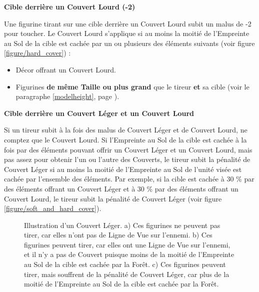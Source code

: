 \noindent\textbf{Cible derrière un Couvert Lourd (-2)}

Une figurine tirant sur une cible derrière un Couvert Lourd subit un malus de -2 pour toucher. Le Couvert Lourd s'applique si au moins la moitié de l'Empreinte au Sol de la cible est cachée par un ou plusieurs des éléments suivants (voir figure \ref{figure/hard_cover}) :
\begin{itemize}[label={-}]
\item Décor offrant un Couvert Lourd.
\item Figurines \textbf{de même Taille ou plus grand} que le tireur \textbf{et} sa cible (voir le paragraphe \ref{modelheight}, page \pageref{modelheight}).
\end{itemize}

\noindent\textbf{Cible derrière un Couvert Léger et un Couvert Lourd}

Si un tireur subit à la fois des malus de Couvert Léger et de Couvert Lourd, ne comptez que le Couvert Lourd. Si l'Empreinte au Sol de la cible est cachée à la fois par des éléments pouvant offrir un Couvert Léger et un Couvert Lourd, mais pas assez pour obtenir l'un ou l'autre des Couverts, le tireur subit la pénalité de Couvert Léger si au moins la moitié de l'Empreinte au Sol de l'unité visée est cachée par l'ensemble des éléments. Par exemple, si la cible est cachée à 30 \% par des éléments offrant un Couvert Léger et à 30 \% par des éléments offrant un Couvert Lourd, le tireur subit la pénalité de Couvert Léger (voir figure \ref{figure/soft_and_hard_cover}).

\newcommand{\figureSCNotinlightofsight}{\normalfontsize{\textit{Pas de Ligne de Vue}}}
\newcommand{\figureSCForest}{Forêt}
\newcommand{\figureSCFire}{\smallfontsize{\textit{Feu !}}}
\newcommand{\figureSCA}{a)}
\newcommand{\figureSCB}{b)}
\newcommand{\figureSCC}{c)}
\newcommand{\figureSCWithinlightofsight}{\normalfontsize{\textit{Ligne de Vue !}}}
\newcommand{\figureSCLessthanhalfoffootprintobscured}{\normalfontsize{\textit{Moins de 50 \% cachée}}}
\newcommand{\figureSCMorethanhalfoffootprintobscured}{\normalfontsize{\textit{Plus de 50 \% cachée}}}

\vspace*{1.5cm}

\begin{figure}[!htbp]
\centering
\def\svgwidth{\textwidth}

\caption{Illustration d'un Couvert Léger.\vspace*{10pt}\newline
a) Ces figurines ne peuvent pas tirer, car elles n'ont pas de Ligne de Vue sur l'ennemi.\vspace*{10pt}\newline
b) Ces figurines peuvent tirer, car elles ont une Ligne de Vue sur l'ennemi, et il n'y a pas de Couvert puisque moins de la moitié de l'Empreinte au Sol de la cible est cachée par la Forêt.\vspace*{10pt}\newline
c) Ces figurines peuvent tirer, mais souffrent de la pénalité de Couvert Léger, car plus de la moitié de l'Empreinte au Sol de la cible est cachée par la Forêt.}
\label{figure/soft_cover}
\end{figure}

